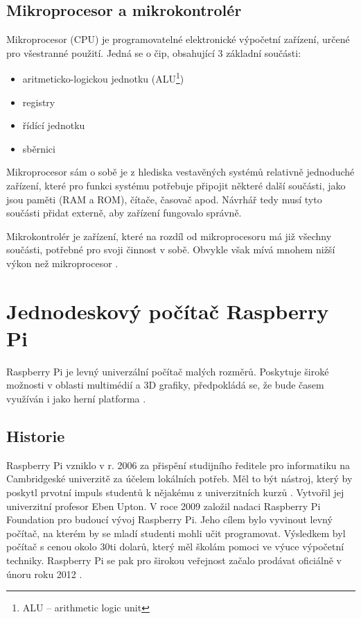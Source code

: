 \subsection*{Mikroprocesor a mikrokontrolér}
Mikroprocesor (CPU) je programovatelné elektronické výpočetní zařízení, určené pro všestranné použití. Jedná se o čip, obsahující 3 základní součásti:
\begin{itemize}
    \item aritmeticko-logickou jednotku (ALU\footnote{ALU -- arithmetic logic unit})
    \item registry
    \item řídící jednotku
    \item sběrnici \cite{MicroprocessorAndInterfaces}
\end{itemize}

Mikroprocesor sám o sobě je z hlediska vestavěných systémů relativně jednoduché zařízení, které pro funkci systému potřebuje připojit některé další součásti, jako jsou paměti (RAM a ROM), čítače, časovač apod. Návrhář tedy musí tyto součásti přidat externě, aby zařízení fungovalo správně. 

Mikrokontrolér je zařízení, které na rozdíl od mikroprocesoru má již všechny součásti, potřebné pro svoji činnost v sobě. Obvykle však mívá mnohem nižší výkon než mikroprocesor \cite{uCvsCPU}.

\section{Jednodeskový počítač Raspberry Pi}
Raspberry Pi je levný univerzální počítač malých rozměrů. Poskytuje široké možnosti v oblasti multimédií a 3D grafiky, předpokládá se, že bude časem využíván i jako herní platforma \cite{RPiPrirucka}.  

\subsection*{Historie}
Raspberry Pi vzniklo v r. 2006 za přispění studijního ředitele pro informatiku na Cambridgeské univerzitě za účelem lokálních potřeb. Měl to být nástroj, který by poskytl prvotní impuls studentů k nějakému z univerzitních kurzů \cite{RPiPrirucka}. Vytvořil jej univerzitní profesor Eben Upton. V roce 2009 založil nadaci Raspberry Pi Foundation pro budoucí vývoj Raspberry Pi. Jeho cílem bylo vyvinout levný počítač, na kterém by se mladí studenti mohli učit programovat. Výsledkem byl počítač s cenou okolo 30ti dolarů, který měl školám pomoci ve výuce výpočetní techniky. Raspberry Pi se pak pro širokou veřejnost začalo prodávat oficiálně v únoru roku 2012 \cite{RPiBeginning}.

